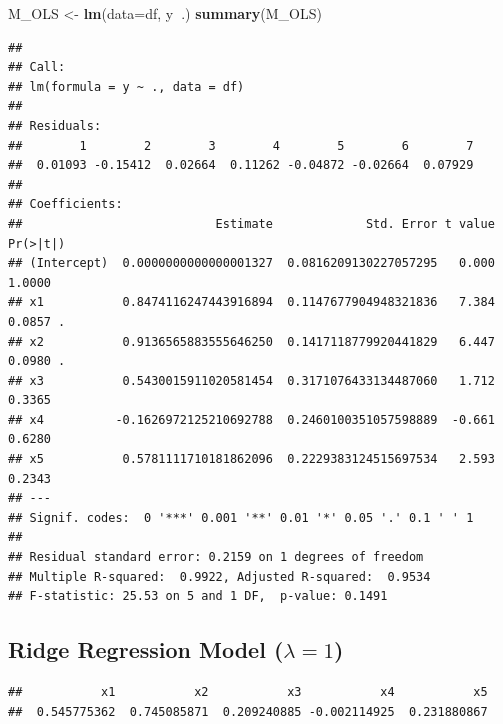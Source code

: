 \documentclass[]{book}
\newenvironment{Shaded}{\begin{snugshade}}{\end{snugshade}}
\newcommand{\KeywordTok}[1]{\textcolor[rgb]{0.13,0.29,0.53}{\textbf{#1}}}
\newcommand{\DataTypeTok}[1]{\textcolor[rgb]{0.13,0.29,0.53}{#1}}
\newcommand{\DecValTok}[1]{\textcolor[rgb]{0.00,0.00,0.81}{#1}}
\newcommand{\StringTok}[1]{\textcolor[rgb]{0.31,0.60,0.02}{#1}}
\newcommand{\OperatorTok}[1]{\textcolor[rgb]{0.81,0.36,0.00}{\textbf{#1}}}
\newcommand{\NormalTok}[1]{#1}
\begin{document}
\begin{Shaded}
\begin{Highlighting}[]
\NormalTok{M_OLS <-}\StringTok{ }\KeywordTok{lm}\NormalTok{(}\DataTypeTok{data=}\NormalTok{df, y}\OperatorTok{~}\NormalTok{.)}
\KeywordTok{summary}\NormalTok{(M_OLS)}
\end{Highlighting}
\end{Shaded}

\begin{verbatim}
## 
## Call:
## lm(formula = y ~ ., data = df)
## 
## Residuals:
##        1        2        3        4        5        6        7 
##  0.01093 -0.15412  0.02664  0.11262 -0.04872 -0.02664  0.07929 
## 
## Coefficients:
##                           Estimate             Std. Error t value Pr(>|t|)  
## (Intercept)  0.0000000000000001327  0.0816209130227057295   0.000   1.0000  
## x1           0.8474116247443916894  0.1147677904948321836   7.384   0.0857 .
## x2           0.9136565883555646250  0.1417118779920441829   6.447   0.0980 .
## x3           0.5430015911020581454  0.3171076433134487060   1.712   0.3365  
## x4          -0.1626972125210692788  0.2460100351057598889  -0.661   0.6280  
## x5           0.5781111710181862096  0.2229383124515697534   2.593   0.2343  
## ---
## Signif. codes:  0 '***' 0.001 '**' 0.01 '*' 0.05 '.' 0.1 ' ' 1
## 
## Residual standard error: 0.2159 on 1 degrees of freedom
## Multiple R-squared:  0.9922, Adjusted R-squared:  0.9534 
## F-statistic: 25.53 on 5 and 1 DF,  p-value: 0.1491
\end{verbatim}

\subsection{\texorpdfstring{Ridge Regression Model
(\(\lambda=1\))}{Ridge Regression Model (\textbackslash{}lambda=1)}}\label{ridge-regression-model-lambda1}

\begin{Shaded}
\end{Shaded}

\begin{verbatim}
##           x1           x2           x3           x4           x5 
##  0.545775362  0.745085871  0.209240885 -0.002114925  0.231880867
\end{verbatim}
\end{document}

